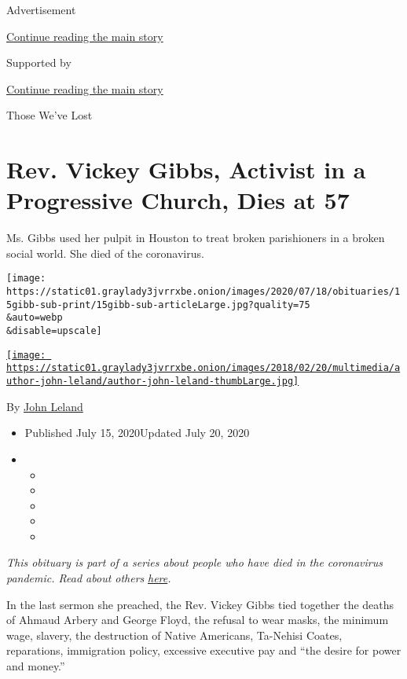 Advertisement

\protect\hyperlink{after-top}{Continue reading the main story}

Supported by

\protect\hyperlink{after-sponsor}{Continue reading the main story}

Those We've Lost

\hypertarget{rev-vickey-gibbs-activist-in-a-progressive-church-dies-at-57}{%
\section{Rev. Vickey Gibbs, Activist in a Progressive Church, Dies at
57}\label{rev-vickey-gibbs-activist-in-a-progressive-church-dies-at-57}}

Ms. Gibbs used her pulpit in Houston to treat broken parishioners in a
broken social world. She died of the coronavirus.

\texttt{[image: https://static01.graylady3jvrrxbe.onion/images/2020/07/18/obituaries/15gibb-sub-print/15gibb-sub-articleLarge.jpg?quality=75\\\&auto=webp\\\&disable=upscale]}

\href{https://www.nytimes3xbfgragh.onion/by/john-leland}{\texttt{[image: https://static01.graylady3jvrrxbe.onion/images/2018/02/20/multimedia/author-john-leland/author-john-leland-thumbLarge.jpg]}}

By \href{https://www.nytimes3xbfgragh.onion/by/john-leland}{John Leland}

\begin{itemize}
\item
  Published July 15, 2020Updated July 20, 2020
\item
  \begin{itemize}
  \item
  \item
  \item
  \item
  \item
  \end{itemize}
\end{itemize}

\emph{This obituary is part of a series about people who have died in
the coronavirus pandemic. Read about others}
\href{https://www.nytimes3xbfgragh.onion/interactive/2020/obituaries/people-died-coronavirus-obituaries.html}{\emph{here}}\emph{.}

In the last sermon she preached, the Rev. Vickey Gibbs tied together the
deaths of Ahmaud Arbery and George Floyd, the refusal to wear masks, the
minimum wage, slavery, the destruction of Native Americans, Ta-Nehisi
Coates, reparations, immigration policy, excessive executive pay and
``the desire for power and money.''

